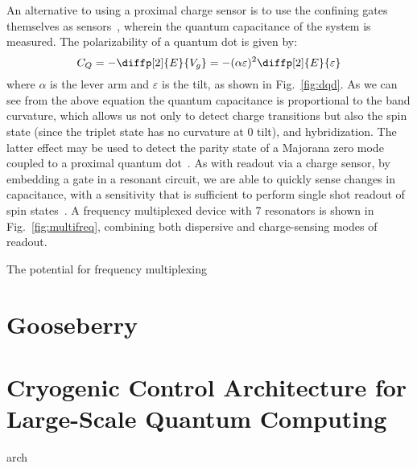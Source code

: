 An alternative to using a proximal charge sensor is to use the confining gates themselves as sensors~\cite{PhysRevLett.110.046805}, wherein the quantum capacitance
of the system is measured. The polarizability of a quantum dot is given by:
\begin{equation}
  C_Q = - \diffp[2]{E}{{V_{g}}} = -(\alpha \varepsilon)^2 \diffp[2]{E}{\varepsilon}
\end{equation}
where $\alpha$ is the lever arm and $\varepsilon$ is the tilt, as shown in Fig.~\ref{fig:dqd}. As we can see from the above equation the quantum capacitance
is proportional to the band curvature, which allows us not only to detect charge transitions but also the spin state (since the triplet state has no
curvature at 0 tilt), and hybridization. The latter effect may be used to detect the parity state of a Majorana zero mode coupled to a proximal
quantum dot~\cite{PhysRevB.95.235305}. As with readout via a charge sensor, by embedding a gate in a resonant circuit, we are able to quickly sense changes
in capacitance, with a sensitivity that is sufficient to perform single shot readout of spin states~\cite{fernando1,Nnano_dzurak}. A frequency multiplexed device
with 7 resonators is shown in Fig.~\ref{fig:multifreq}, combining both dispersive and charge-sensing modes of readout.

The potential for frequency multiplexing

\clearpage
\section{Gooseberry}
\label{sec:gooseberry}

\clearpage
\section{Cryogenic Control Architecture for Large-Scale Quantum Computing}
\label{sec:primelines}
{arch}
